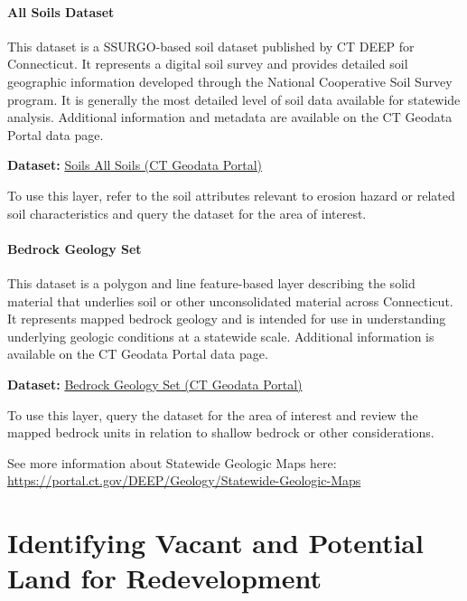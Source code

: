 \documentclass[
  letterpaper,
  DIV=11,
  numbers=noendperiod]{scrreprt}
\begin{document}
\subsubsection{All Soils Dataset}\label{sec-all-soils}

This dataset is a SSURGO-based soil dataset published by CT DEEP for
Connecticut. It represents a digital soil survey and provides detailed
soil geographic information developed through the National Cooperative
Soil Survey program. It is generally the most detailed level of soil
data available for statewide analysis. Additional information and
metadata are available on the CT Geodata Portal data page.

\textbf{Dataset:}
\href{https://geodata.ct.gov/datasets/CTDEEP::soils-all-soils/about}{Soils
All Soils (CT Geodata Portal)}

To use this layer, refer to the soil attributes relevant to erosion
hazard or related soil characteristics and query the dataset for the
area of interest.

\subsubsection{Bedrock Geology Set}\label{sec-bedrock-geology-set}

This dataset is a polygon and line feature-based layer describing the
solid material that underlies soil or other unconsolidated material
across Connecticut. It represents mapped bedrock geology and is intended
for use in understanding underlying geologic conditions at a statewide
scale. Additional information is available on the CT Geodata Portal data
page.

\textbf{Dataset:}
\href{https://geodata.ct.gov/maps/a765e96b0c05413da1dcbea0ae86707d/about}{Bedrock
Geology Set (CT Geodata Portal)}

To use this layer, query the dataset for the area of interest and review
the mapped bedrock units in relation to shallow bedrock or other
considerations.

See more information about Statewide Geologic Maps here:
\url{https://portal.ct.gov/DEEP/Geology/Statewide-Geologic-Maps}


\chapter{Identifying Vacant and Potential Land for
Redevelopment}\label{identifying-vacant-and-potential-land-for-redevelopment}
\end{document}
